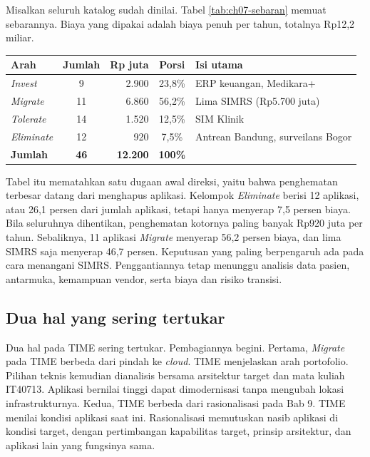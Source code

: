 \begin{kasus}[title={Kasus Medikara Health: Sebaran 46 Aplikasi dan Biayanya}]
  Misalkan seluruh katalog sudah dinilai. Tabel \ref{tab:ch07-sebaran} memuat sebarannya. Biaya yang
  dipakai adalah biaya penuh per tahun, totalnya Rp12,2 miliar.

  \begin{center}
    \label{tab:ch07-sebaran}
    \small
    \begin{tabularx}{\linewidth}{>{\raggedright\arraybackslash}p{1.7cm}crc>{\raggedright\arraybackslash}X}
      \hline
      \textbf{Arah} & \textbf{Jumlah} & \textbf{Rp juta} & \textbf{Porsi} & \textbf{Isi utama} \\
      \hline
      \textit{Invest} & 9 & 2.900 & 23,8\% & ERP keuangan, Medikara+ \\
      \hline
      \textit{Migrate} & 11 & 6.860 & 56,2\% & Lima SIMRS (Rp5.700 juta) \\
      \hline
      \textit{Tolerate} & 14 & 1.520 & 12,5\% & SIM Klinik \\
      \hline
      \textit{Eliminate} & 12 & 920 & 7,5\% & Antrean Bandung, surveilans Bogor \\
      \hline
      \textbf{Jumlah} & \textbf{46} & \textbf{12.200} & \textbf{100\%} & \\
      \hline
    \end{tabularx}
  \end{center}

  Tabel itu mematahkan satu dugaan awal direksi, yaitu bahwa penghematan terbesar datang dari menghapus
  aplikasi. Kelompok \textit{Eliminate} berisi 12 aplikasi, atau 26,1 persen dari jumlah aplikasi,
  tetapi hanya menyerap 7,5 persen biaya. Bila seluruhnya dihentikan, penghematan kotornya paling
  banyak Rp920 juta per tahun. Sebaliknya, 11 aplikasi \textit{Migrate} menyerap 56,2 persen biaya, dan
  lima SIMRS saja menyerap 46,7 persen. Keputusan yang paling berpengaruh ada pada cara menangani
  SIMRS. Penggantiannya tetap menunggu analisis data pasien, antarmuka, kemampuan vendor, serta biaya
  dan risiko transisi.
\end{kasus}

\subsection*{Dua hal yang sering tertukar}

Dua hal pada TIME sering tertukar. Pembagiannya begini. Pertama, \textit{Migrate} pada TIME berbeda
dari pindah ke \textit{cloud}. TIME menjelaskan arah portofolio. Pilihan teknis kemudian dianalisis
bersama arsitektur target dan mata kuliah IT40713. Aplikasi bernilai tinggi dapat dimodernisasi tanpa
mengubah lokasi infrastrukturnya. Kedua, TIME berbeda dari rasionalisasi pada Bab 9. TIME menilai
kondisi aplikasi saat ini. Rasionalisasi memutuskan nasib aplikasi di kondisi target, dengan
pertimbangan kapabilitas target, prinsip arsitektur, dan aplikasi lain yang fungsinya sama.

